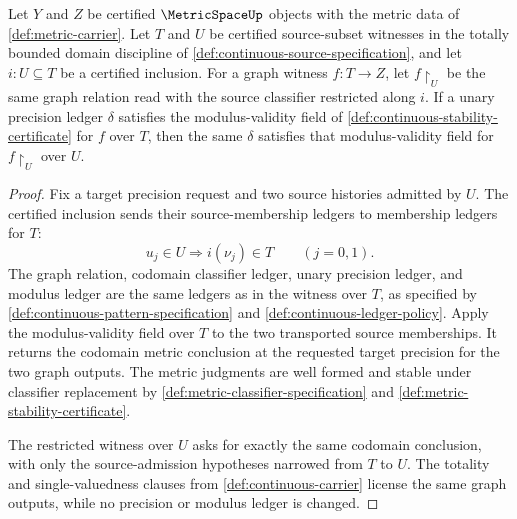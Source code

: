 \begin{proposition}
\label{prop:uniform-modulus-restriction-subset-containment}
Let \(Y\) and \(Z\) be certified \(\MetricSpaceUp\) objects with the metric data of \autoref{def:metric-carrier}. Let \(T\) and \(U\) be certified source-subset witnesses in the totally bounded domain discipline of \autoref{def:continuous-source-specification}, and let \(i:U\subseteq T\) be a certified inclusion. For a graph witness \(f:T\to Z\), let \(f\!\restriction_U\) be the same graph relation read with the source classifier restricted along \(i\). If a unary precision ledger \(\delta\) satisfies the modulus-validity field of \autoref{def:continuous-stability-certificate} for \(f\) over \(T\), then the same \(\delta\) satisfies that modulus-validity field for \(f\!\restriction_U\) over \(U\).
\end{proposition}
\begin{proof}
Fix a target precision request and two source histories admitted by \(U\). The certified inclusion sends their source-membership ledgers to membership ledgers for \(T\):
$$
u_j\in U\Longrightarrow i(\nu_j)\in T\qquad(j=0,1).
$$
The graph relation, codomain classifier ledger, unary precision ledger, and modulus ledger are the same ledgers as in the witness over \(T\), as specified by \autoref{def:continuous-pattern-specification} and \autoref{def:continuous-ledger-policy}. Apply the modulus-validity field over \(T\) to the two transported source memberships. It returns the codomain metric conclusion at the requested target precision for the two graph outputs. The metric judgments are well formed and stable under classifier replacement by \autoref{def:metric-classifier-specification} and \autoref{def:metric-stability-certificate}.

The restricted witness over \(U\) asks for exactly the same codomain conclusion, with only the source-admission hypotheses narrowed from \(T\) to \(U\). The totality and single-valuedness clauses from \autoref{def:continuous-carrier} license the same graph outputs, while no precision or modulus ledger is changed.
\end{proof}
